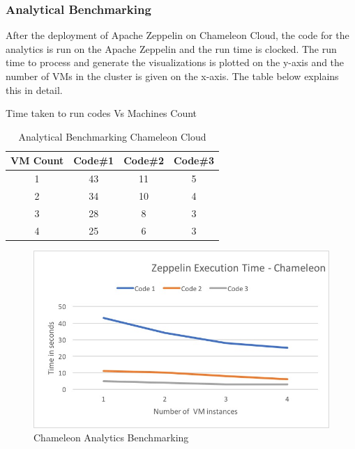 \documentclass[9pt,twocolumn,twoside]{../../styles/osajnl}
\begin{document}
	\subsubsection{Analytical Benchmarking}
	
	After the deployment of Apache Zeppelin on Chameleon Cloud, the 
	code 
	for the analytics is run on the Apache Zeppelin and the run time 
	is 
	clocked. The run time to process and generate the visualizations 
	is 
	plotted on the y-axis and the number of VMs in the cluster is 
	given 
	on the x-axis. The table below explains this in detail.
	
	\begin{table}[ht]
		\caption{Analytical Benchmarking Chameleon Cloud} %
		\centering %
		Time taken to run codes Vs Machines Count \\
		\begin{tabular}{c c c c} %
			\hline
			\hline %
			VM Count & Code\#1 & Code\#2 & Code\#3 \\ [0.5ex] %
			\hline %
			1 & 43 & 11 & 5 \\ %
			2 & 34 & 10 & 4 \\
			3 & 28 & 8 & 3 \\
			4 & 25 & 6 & 3 \\ [1ex] %
			\hline %
		\end{tabular}
		\label{table:nonlin} %
	\end{table}
	
	\begin{figure}
		\includegraphics[width=\linewidth]{./images/Chameleon_analytic_deployment}
		\caption{Chameleon Analytics Benchmarking}
		\label{fig:Chameleon Analytics Benchmarking}
	\end{figure}
	
\end{document}
